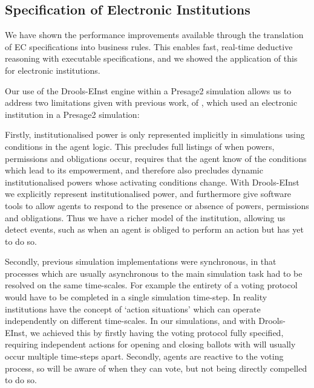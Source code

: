 \subsection{Specification of Electronic Institutions}

We have shown the performance improvements available through the translation
of \ac{EC} specifications into business rules. This enables fast, real-time
deductive reasoning with executable specifications, and we showed the
application of this for electronic institutions.

Our use of the Drools-EInst engine within a Presage2 simulation allows us to
address two limitations given with previous work, of \citet{Schaumeier2013},
which used an electronic institution in a Presage2 simulation:

Firstly, institutionalised power is only represented implicitly in simulations
using conditions in the agent logic. This precludes full listings of when
powers, permissions and obligations occur, requires that the agent know of the
conditions which lead to its empowerment, and therefore also precludes dynamic
institutionalised powers whose activating conditions change. With Drools-EInst
we explicitly represent institutionalised power, and furthermore give software
tools to allow agents to respond to the presence or absence of powers,
permissions and obligations. Thus we have a richer model of the institution,
allowing us detect events, such as when an agent is obliged to perform an
action but has yet to do so.

Secondly, previous simulation implementations were synchronous, in that
processes which are usually asynchronous to the main simulation task had to be
resolved on the same time-scales. For example the entirety of a voting
protocol would have to be completed in a single simulation time-step. In
reality institutions have the concept of `action situations' which can operate
independently on different time-scales. In our simulations, and with Drools-
EInst, we achieved this by firstly having the voting protocol fully specified,
requiring independent actions for opening and closing ballots with will
usually occur multiple time-steps apart. Secondly, agents are reactive to the
voting process, so will be aware of when they can vote, but not being directly
compelled to do so.



